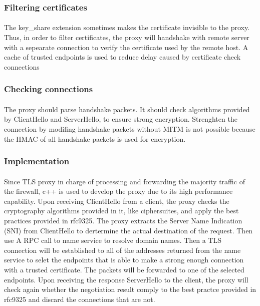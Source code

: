 \documentclass[mscthesis]{usiinfthesis}
\begin{document}
\subsubsection{Filtering certificates}
\paragraph{}
The key\_share extension sometimes makes the certificate invisible to the proxy. Thus, in order to filter certificates, the proxy will handshake with remote server with a sepearate connection to verify the certificate used by the remote host. A cache of trusted endpoints is used to reduce delay caused by certificate check connections
\subsubsection{Checking connections}
\paragraph{}
The proxy should parse handshake packets. It should check algorithms provided by ClientHello and ServerHello, to ensure strong encryption. Strenghten the connection by modifing handshake packets without MITM is not possible because the HMAC of all handshake packets is used for encryption.
\subsubsection{Implementation}
\paragraph{}
Since TLS proxy in charge of processing and forwarding the majority traffic of the firewall, c++ is used to develop the proxy due to its high performance capability. Upon receiving ClientHello from a client, the proxy checks the cryptography algorithms provided in it, like ciphersuites, and apply the best practices provided in rfc9325. The proxy extracts the Server Name Indication (SNI) from ClientHello to dertermine the actual destination of the request. Then use A RPC call to name service to resolve domain names. Then a TLS connection will be established to all of the addresses returned from the name service to selet the endpoints that is able to make a strong enough connection with a trusted certificate. The packets will be forwarded to one of the selected endpoints. Upon receiving the response ServerHello to the client, the proxy will check again whether the negotiation result comply to the best practce provided in rfc9325 and discard the connections that are not.
\end{document}
